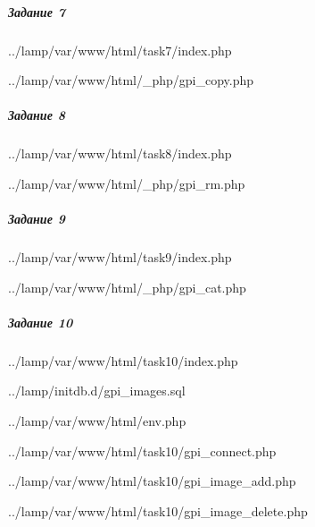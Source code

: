 
\subparagraph{Задание 7} \hspace{0pt}


{../lamp/var/www/html/task7/index.php}


{../lamp/var/www/html/_php/gpi_copy.php}


\subparagraph{Задание 8} \hspace{0pt}


{../lamp/var/www/html/task8/index.php}


{../lamp/var/www/html/_php/gpi_rm.php}


\subparagraph{Задание 9} \hspace{0pt}


{../lamp/var/www/html/task9/index.php}


{../lamp/var/www/html/_php/gpi_cat.php}


\subparagraph{Задание 10} \hspace{0pt}


{../lamp/var/www/html/task10/index.php}


{../lamp/initdb.d/gpi_images.sql}


{../lamp/var/www/html/env.php}


{../lamp/var/www/html/task10/gpi_connect.php}


{../lamp/var/www/html/task10/gpi_image_add.php}


{../lamp/var/www/html/task10/gpi_image_delete.php}
